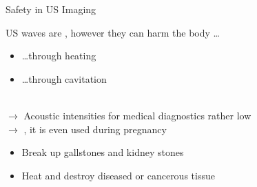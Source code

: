 \begin{frame}{Safety in US Imaging}

    US waves are , however they can harm the body \dots
    \begin{itemize}
        \item \dots through heating\\
              \hspace{1cm}{$\rightarrow$ locally, proportional to absorbed acoustic intensity ($J$)}
        \item \dots through cavitation\\
              \hspace{1cm}{$\rightarrow$ emerging gas bubbles in low pressure phase of sound wave}\\
              \hspace{1cm}{$\rightarrow$ collapse at high pressure phase}
    \end{itemize}
    \vspace{.5cm}
    $\rightarrow$ Acoustic intensities for medical diagnostics rather low\\
    $\rightarrow$ , it is even used during pregnancy

    \begin{itemize}
        \item Break up gallstones and kidney stones
        \item Heat and destroy diseased or cancerous tissue
    \end{itemize}
\end{frame}



